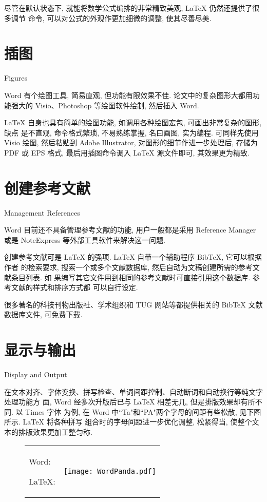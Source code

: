 尽管在默认状态下, 就能将数学公式编排的非常精致美观, \LaTeX{}\index{\LaTeX} 仍然还提供了很多调节
命令, 可以对公式的外观作更加细微的调整, 使其尽善尽美.

\section{插图}{Figures}

Word 有个绘图工具, 简易直观, 但功能有限效果不佳. 论文中的复杂图形大都用功能强大的
Visio、Photoshop 等绘图软件绘制, 然后插入 Word.

\LaTeX{}\index{\LaTeX} 自身也具有简单的绘图功能, 如调用各种绘图宏包, 可画出非常复杂的图形, 缺点
是不直观, 命令格式繁琐, 不易熟练掌握, 名曰画图, 实为编程. 可同样先使用 Visio 绘图,
然后粘贴到 Adobe Illustrator, 对图形的细节作进一步处理后, 存储为 PDF 或 EPS 格式,
最后用插图命令调入 \LaTeX{}\index{\LaTeX} 源文件即可, 其效果更为精致.

\section{创建参考文献}{Management References}

Word 目前还不具备管理参考文献的功能, 用户一般都是采用 Reference Manager 或是
NoteExpress 等外部工具软件来解决这一问题.

创建参考文献可是 \LaTeX{}\index{\LaTeX} 的强项. \LaTeX{}\index{\LaTeX} 自带一个辅助程序 BibTeX, 它可以根据作者
的检索要求, 搜索一个或多个文献数据库, 然后自动为文稿创建所需的参考文献条目列表. 如
果编写其它文件用到相同的参考文献时可直接引用这个数据库. 参考文献的样式和排序方式都
可以自行设定.

很多著名的科技刊物出版社、学术组织和 TUG 网站等都提供相关的 BibTeX 文献数据库文件,
可免费下载.

\section{显示与输出}{Display and Output}

在文本对齐、字体变换、拼写检查、单词间距控制、自动断词和自动换行等纯文字处理功能方
面, Word 经多次升版后已与 \LaTeX{}\index{\LaTeX} 相差无几, 但是排版效果却有所不同. 以 Times 字体
为例, 在 Word 中``Ta"和``PA"两个字母的间距有些松散, 见下图所示. \LaTeX{}\index{\LaTeX} 将各种拼写
组合时的字母间距进一步优化调整, 松紧得当, 使整个文本的排版效果更加工整匀称.

\begin{figure}
  \centering
  \begin{tabu}spread 1mm{X[-1rm]X[lm]}
    Word:\par\LaTeX: & \texttt{[image: WordPanda.pdf]}\\
  \end{tabu}\vskip-5pt
\end{figure}

